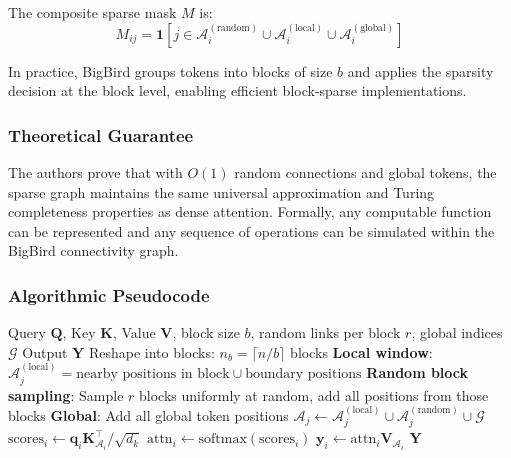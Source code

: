 The composite sparse mask $M$ is:
\[
M_{ij} = \mathbf{1}[j \in \mathcal{A}_i^{(\text{random})} \cup \mathcal{A}_i^{(\text{local})} \cup \mathcal{A}_i^{(\text{global})}]
\]

In practice, BigBird groups tokens into blocks of size $b$ and applies the sparsity decision at the block level, enabling efficient block-sparse implementations.

\subsubsection{Theoretical Guarantee}

The authors prove that with $O(1)$ random connections and global tokens, the sparse graph maintains the same universal approximation and Turing completeness properties as dense attention. Formally, any computable function can be represented and any sequence of operations can be simulated within the BigBird connectivity graph.

\subsubsection{Algorithmic Pseudocode}

\begin{algorithm}[H]
\caption{BigBird: Random + Local + Global Block-Sparse Attention}
\begin{algorithmic}[1]
\Require Query $\mathbf{Q}$, Key $\mathbf{K}$, Value $\mathbf{V}$, block size $b$, random links per block $r$, global indices $\mathcal{G}$
\Ensure Output $\mathbf{Y}$
\State Reshape into blocks: $n_b = \lceil n / b \rceil$ blocks
        \State \textbf{Local window}: $\mathcal{A}_j^{(\text{local})} = \text{nearby positions in block} \cup \text{boundary positions}$
        \State \textbf{Random block sampling}: Sample $r$ blocks uniformly at random, add all positions from those blocks
        \State \textbf{Global}: Add all global token positions
        \State $\mathcal{A}_j \gets \mathcal{A}_j^{(\text{local})} \cup \mathcal{A}_j^{(\text{random})} \cup \mathcal{G}$
    \EndFor
\EndFor
{}
    \State $\text{scores}_i \gets \mathbf{q}_i \mathbf{K}_{\mathcal{A}_i}^\top / \sqrt{d_k}$
    \State $\text{attn}_i \gets \text{softmax}(\text{scores}_i)$
    \State $\mathbf{y}_i \gets \text{attn}_i \mathbf{V}_{\mathcal{A}_i}$
\EndFor
\Return $\mathbf{Y}$
\end{algorithmic}
\end{algorithm}

